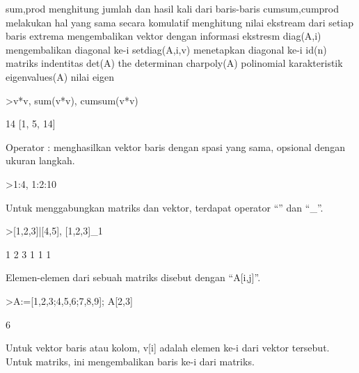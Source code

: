 \documentclass{article}
\begin{document}
\begin{eulernotebook}
\begin{eulercomment}
\end{eulercomment}
\begin{eulerttcomment}
  sum,prod menghitung jumlah dan hasil kali dari baris-baris
  cumsum,cumprod melakukan hal yang sama secara komulatif
  menghitung nilai ekstream dari setiap baris
  extrema mengembalikan vektor dengan informasi ekstresm
  diag(A,i) mengembalikan diagonal ke-i
  setdiag(A,i,v) menetapkan diagonal ke-i
  id(n) matriks indentitas
  det(A) the determinan
  charpoly(A) polinomial karakteristik
  eigenvalues(A) nilai eigen
\end{eulerttcomment}
\begin{eulerprompt}
>v*v, sum(v*v), cumsum(v*v)
\end{eulerprompt}
\begin{euleroutput}
  [1,  4,  9]
  14
  [1,  5,  14]
\end{euleroutput}
\begin{eulercomment}
Operator : menghasilkan vektor baris dengan spasi yang sama, opsional
dengan ukuran langkah.
\end{eulercomment}
\begin{eulerprompt}
>1:4, 1:2:10
\end{eulerprompt}
\begin{euleroutput}
  [1,  2,  3,  4]
  [1,  3,  5,  7,  9]
\end{euleroutput}
\begin{eulercomment}
Untuk menggabungkan matriks dan vektor, terdapat operator “\textbar{}” dan “\_”.
\end{eulercomment}
\begin{eulerprompt}
>[1,2,3]|[4,5], [1,2,3]_1
\end{eulerprompt}
\begin{euleroutput}
  [1,  2,  3,  4,  5]
              1             2             3 
              1             1             1 
\end{euleroutput}
\begin{eulercomment}
Elemen-elemen dari sebuah matriks disebut dengan “A[i,j]”.
\end{eulercomment}
\begin{eulerprompt}
>A:=[1,2,3;4,5,6;7,8,9]; A[2,3]
\end{eulerprompt}
\begin{euleroutput}
  6
\end{euleroutput}
\begin{eulercomment}
Untuk vektor baris atau kolom, v[i] adalah elemen ke-i dari vektor
tersebut. Untuk matriks, ini mengembalikan baris ke-i dari matriks.

\end{eulercomment}
\end{eulernotebook}
\end{document}
